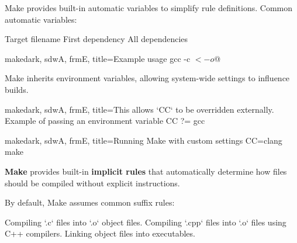 \bigskip

\begin{NxSSSSBox}
	\begin{NxIDBox}
		Make provides built-in automatic variables to simplify rule definitions.
		Common automatic variables:
		\begin{NxListDark}
			\nxIDSTopic{\$\nxAt} Target filename
			\nxIDSTopic{\$<} First dependency
			\nxIDSTopic{\$\nxHat}  All dependencies
		\end{NxListDark}
	\end{NxIDBox}
\end{NxSSSSBox}

\begin{NxCodeBox}{make}{dark, sdwA, frmE, title={Example usage}}
		gcc -c $< -o $@
\end{NxCodeBox}

\bigskip

\begin{NxSSSSBox}
	\begin{NxIDBox}
		Make inherits environment variables, allowing system-wide settings to influence builds.
	\end{NxIDBox}
\end{NxSSSSBox}

\begin{NxCodeBox}{make}{dark, sdwA, frmE, title={This allows `CC` to be overridden externally. Example of passing an environment variable}}
	CC ?= gcc
\end{NxCodeBox}

\bigskip

\begin{NxCodeBox}{make}{dark, sdwA, frmE, title={Running Make with custom settings}}
		CC=clang make
\end{NxCodeBox}

\bigskip

\begin{NxSSSSBox}
	\begin{NxIDBox}
		\textbf{Make} provides built-in \textbf{implicit rules} that automatically determine how files should be compiled without explicit instructions.
	\end{NxIDBox}
	\begin{NxIDBox}
		By default, Make assumes common suffix rules:
		\begin{NxListDark}
			 Compiling `.c` files into `.o` object files.
			 Compiling `.cpp` files into `.o` files using C++ compilers.
			 Linking object files into executables.
		\end{NxListDark}
	\end{NxIDBox}
\end{NxSSSSBox}

